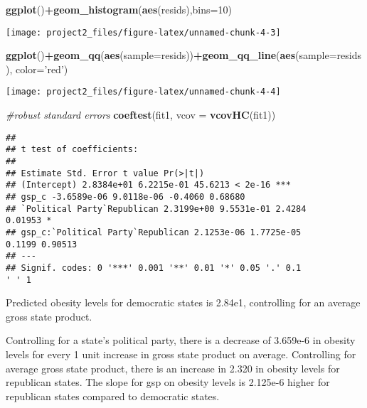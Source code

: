 \documentclass[]{article}
\newenvironment{Shaded}{\begin{snugshade}}{\end{snugshade}}
\newcommand{\CommentTok}[1]{\textcolor[rgb]{0.56,0.35,0.01}{\textit{#1}}}
\newcommand{\DataTypeTok}[1]{\textcolor[rgb]{0.13,0.29,0.53}{#1}}
\newcommand{\DecValTok}[1]{\textcolor[rgb]{0.00,0.00,0.81}{#1}}
\newcommand{\KeywordTok}[1]{\textcolor[rgb]{0.13,0.29,0.53}{\textbf{#1}}}
\newcommand{\NormalTok}[1]{#1}
\newcommand{\OperatorTok}[1]{\textcolor[rgb]{0.81,0.36,0.00}{\textbf{#1}}}
\newcommand{\StringTok}[1]{\textcolor[rgb]{0.31,0.60,0.02}{#1}}
\begin{document}
\begin{Shaded}
\begin{Highlighting}[]
\KeywordTok{ggplot}\NormalTok{()}\OperatorTok{+}\KeywordTok{geom_histogram}\NormalTok{(}\KeywordTok{aes}\NormalTok{(resids),}\DataTypeTok{bins=}\DecValTok{10}\NormalTok{)}
\end{Highlighting}
\end{Shaded}

\begin{center}\texttt{[image: project2\_files/figure-latex/unnamed-chunk-4-3]} \end{center}

\begin{Shaded}
\begin{Highlighting}[]
\KeywordTok{ggplot}\NormalTok{()}\OperatorTok{+}\KeywordTok{geom_qq}\NormalTok{(}\KeywordTok{aes}\NormalTok{(}\DataTypeTok{sample=}\NormalTok{resids))}\OperatorTok{+}\KeywordTok{geom_qq_line}\NormalTok{(}\KeywordTok{aes}\NormalTok{(}\DataTypeTok{sample=}\NormalTok{resids), }\DataTypeTok{color=}\StringTok{'red'}\NormalTok{)}
\end{Highlighting}
\end{Shaded}

\begin{center}\texttt{[image: project2\_files/figure-latex/unnamed-chunk-4-4]} \end{center}

\begin{Shaded}
\begin{Highlighting}[]
\CommentTok{#robust standard errors}
\KeywordTok{coeftest}\NormalTok{(fit1, }\DataTypeTok{vcov =} \KeywordTok{vcovHC}\NormalTok{(fit1))}
\end{Highlighting}
\end{Shaded}

\begin{verbatim}
##
## t test of coefficients:
##
## Estimate Std. Error t value Pr(>|t|)
## (Intercept) 2.8384e+01 6.2215e-01 45.6213 < 2e-16 ***
## gsp_c -3.6589e-06 9.0118e-06 -0.4060 0.68680
## `Political Party`Republican 2.3199e+00 9.5531e-01 2.4284
0.01953 *
## gsp_c:`Political Party`Republican 2.1253e-06 1.7725e-05
0.1199 0.90513
## ---
## Signif. codes: 0 '***' 0.001 '**' 0.01 '*' 0.05 '.' 0.1
' ' 1
\end{verbatim}

Predicted obesity levels for democratic states is 2.84e1, controlling
for an average gross state product.

Controlling for a state's political party, there is a decrease of
3.659e-6 in obesity levels for every 1 unit increase in gross state
product on average. Controlling for average gross state product, there
is an increase in 2.320 in obesity levels for republican states. The
slope for gsp on obesity levels is 2.125e-6 higher for republican states
compared to democratic states.
\end{document}
